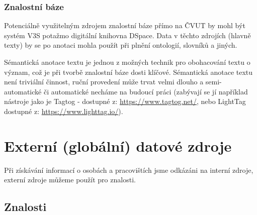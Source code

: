 \subsubsection{Znalostní báze}
Potenciálně využitelným zdrojem znalostní báze přímo na ČVUT by mohl být systém V3S potažmo digitální knihovna DSpace. Data v těchto zdrojích (hlavně texty) by se po anotaci \cite{semantic-annotation} mohla použít při plnění ontologií, slovníků a jiných.\par 
Sémantická anotace textu je jednou z možných technik pro obohacování textu o význam, což je při tvorbě znalostní báze dosti klíčové. Sémantická anotace textu není triviální činnost, ruční provedení může trvat velmi dlouho a semi-automatické či automatické necháme na budoucí práci (zabývají se jí například nástroje jako je Tagtog - dostupné z: \url{https://www.tagtog.net/}, nebo LightTag dostupné z: \url{https://www.lighttag.io/}).

\section{Externí (globální) datové zdroje}
Při získávání informací o osobách a pracovištích jsme odkázáni na interní zdroje, externí zdroje můžeme použít pro znalosti. 
\subsection{Znalosti}

